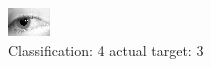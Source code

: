 \begin{figure}[h!]
\begin{center}
\includegraphics[width=0.60\columnwidth]{figures/ID1336_class_4_target_3.png}
\end{center}
\caption{ Classification: 4 actual target: 3}
\label{fig:ID1336_class_4_target_3}
\end{figure}
